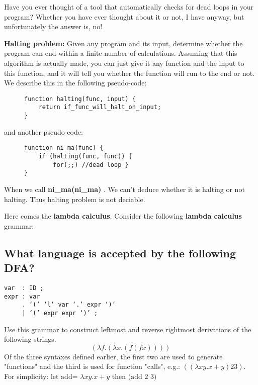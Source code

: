 \documentclass[a4paper]{article}
\theoremstyle{definition}
\begin{document}
Have you ever thought of a tool that automatically checks for dead loops in your program? Whether you have ever thought about it or not, I have anyway, but unfortunately the answer is, no!

\textbf{Halting problem:} Given any program and its input, determine whether the program can end within a finite number of calculations. Assuming that this algorithm is actually made, you can just give it any function and the input to this function, and it will tell you whether the function will run to the end or not.
We describe this in the following pseudo-code:


\begin{figure}[H]
    \begin{lstlisting}[language={[ANSI]C}]
function halting(func, input) {
    return if_func_will_halt_on_input;
}
    \end{lstlisting}
\end{figure}

and another pseudo-code:
\begin{figure}[H]
    \begin{lstlisting}[language={[ANSI]C}]
function ni_ma(func) {
    if (halting(func, func)) {
        for(;;) //dead loop }
}
    \end{lstlisting}
\end{figure}

When we call \textbf { ni\_ma(ni\_ma) }. We can't deduce whether it is halting or not halting. Thus halting problem is not deciable.


Here comes the \textbf{lambda calculus}, Consider the following \textbf{lambda calculus} grammar:
\subsection{What language is accepted by the following DFA?}
\begin{verbatim}
var  : ID ;
expr : var
     . ‘(’ ‘l’ var ‘.’ expr ‘)’
     | ‘(’ expr expr ‘)’ ;
\end{verbatim}

Use this \href{http://s3l.shanghaitech.edu.cn:8081/compiler/discussion3-lambda_test}{grammar} to construct leftmost and reverse rightmost derivations of the following strings.
$$
(\lambda f .(\lambda x .(f(f x))))
$$
Of the three syntaxes defined earlier, the first two are used to generate "functions" and the third is used for function "calls", e.g.: $ ((\lambda xy.x+y)23) $. For simplicity: $\text {let add= }\lambda{ xy.x+y}$ then $\text{(add 2 3)}$\\
\end{document}
